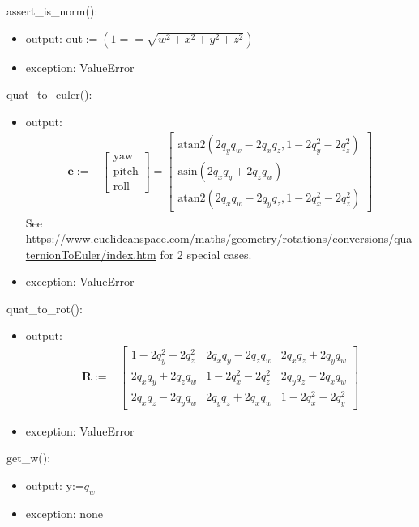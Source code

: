 \documentclass[12pt, titlepage]{article}
\begin{document}
\noindent assert\_is\_norm():
\begin{itemize}
\item output: out$:= (1 == \sqrt{w^2 + x^2 + y^2 + z^2})$
\item exception: ValueError
\end{itemize}

\noindent quat\_to\_euler():
\begin{itemize}
\item output: \begin{align*} \mathbf{e} :=& \begin{bmatrix} \text{yaw} \\ \text{pitch} \\
  \text{roll} \end{bmatrix} =
  \begin{bmatrix}
    \text{atan2}(2 q_y q_w - 2 q_x q_z, 1 - 2 q_y^2 - 2 q_z ^ 2) \\
    \text{asin}(2 q_x q_y + 2 q_z q_w) \\
    \text{atan2}(2 q_x q_w - 2 q_y q_z, 1 - 2 q_x^2 - 2 q_z ^2)
  \end{bmatrix}
\end{align*}
See
\url{https://www.euclideanspace.com/maths/geometry/rotations/conversions/quaternionToEuler/index.htm}
for 2 special cases.
\item exception: ValueError
\end{itemize}

\noindent quat\_to\_rot():
\begin{itemize}
\item output: \begin{align*} \mathbf{R}:= & \begin{bmatrix} 1- 2 q_y^2 - 2 q_z^2 & 2 q_x q_y - 2 q_z
  q_w & 2 q_x q_z + 2 q_y q_w \\
    2 q_x q_y + 2 q_z q_w & 1 -2 q_x^2 - 2 q_z^2 & 2 q_y q_z - 2 q_x q_w \\
    2 q_x q_z - 2 q_y q_w & 2 q_y q_z + 2 q_x q_w & 1 -2 q_x^2 - 2 q_y ^2
  \end{bmatrix}
\end{align*}
\item exception: ValueError
\end{itemize}

\noindent get\_w():
\begin{itemize}
\item output: y:=$q_w$
\item exception: none
\end{itemize}
\end{document}
